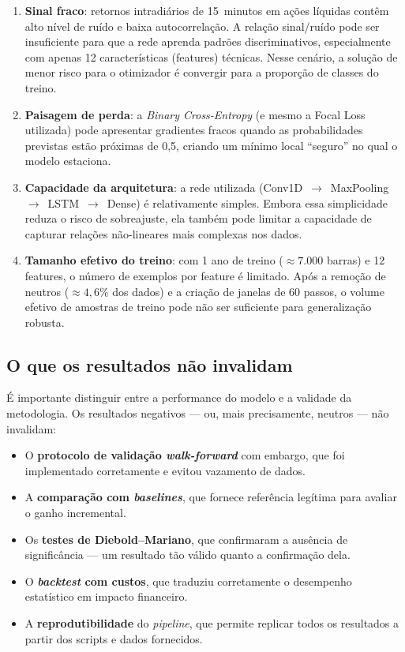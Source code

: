 \begin{enumerate}
  \item \textbf{Sinal fraco}: retornos intradiários de 15~minutos em ações líquidas
  contêm alto nível de ruído e baixa autocorrelação. A relação sinal/ruído pode ser
  insuficiente para que a rede aprenda padrões discriminativos, especialmente com apenas
  12 características (features) técnicas. Nesse cenário, a solução de menor risco para o otimizador é
  convergir para a proporção de classes do treino.

  \item \textbf{Paisagem de perda}: a \emph{Binary Cross-Entropy} (e mesmo a Focal Loss
  utilizada) pode apresentar gradientes fracos quando as probabilidades previstas estão
  próximas de 0,5, criando um mínimo local ``seguro'' no qual o modelo estaciona.

  \item \textbf{Capacidade da arquitetura}: a rede utilizada (Conv1D~$\rightarrow$~MaxPooling~$\rightarrow$~LSTM~$\rightarrow$~Dense)
  é relativamente simples. Embora essa simplicidade reduza o risco de sobreajuste,
  ela também pode limitar a capacidade de capturar relações não-lineares mais complexas
  nos dados.

  \item \textbf{Tamanho efetivo do treino}: com 1 ano de treino ($\approx 7{.}000$ barras)
  e 12 features, o número de exemplos por feature é limitado. Após a remoção de neutros
  ($\approx 4{,}6$\% dos dados) e a criação de janelas de 60 passos, o volume efetivo de
  amostras de treino pode não ser suficiente para generalização robusta.
\end{enumerate}

\subsection{O que os resultados não invalidam}

É importante distinguir entre a performance do modelo e a validade da metodologia.
Os resultados negativos --- ou, mais precisamente, neutros --- não invalidam:

\begin{itemize}
  \item O \textbf{protocolo de validação \textit{walk-forward}} com embargo, que foi implementado
  corretamente e evitou vazamento de dados.
  \item A \textbf{comparação com \textit{baselines}}, que fornece referência legítima para avaliar
  o ganho incremental.
  \item Os \textbf{testes de Diebold--Mariano}, que confirmaram a ausência de significância
  --- um resultado tão válido quanto a confirmação dela.
  \item O \textbf{\textit{backtest} com custos}, que traduziu corretamente o desempenho estatístico
  em impacto financeiro.
  \item A \textbf{reprodutibilidade} do \textit{pipeline}, que permite replicar todos os resultados
  a partir dos scripts e dados fornecidos.
\end{itemize}


